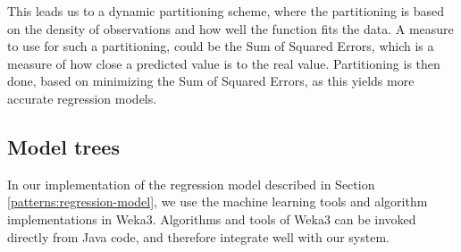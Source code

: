 This leads us to a dynamic partitioning scheme, where the partitioning is based on the density of observations and how well the function fits the data. A measure to use for such a partitioning, could be the Sum of Squared Errors, which is a measure of how close a predicted value is to the real value. Partitioning is then done, based on minimizing the Sum of Squared Errors, as this yields more accurate regression models.



\subsection{Model trees}\label{patterns:weka}
In our implementation of the regression model described in Section \ref{patterns:regression-model}, we use the machine learning tools and algorithm implementations in Weka3. Algorithms and tools of Weka3 can be invoked directly from Java code, and therefore integrate well with our system.

